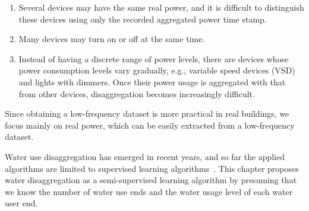 \begin{enumerate}
\item Several devices may have the same real power, and
it is difficult to distinguish these devices using only the recorded aggregated
power time stamp.
\item Many devices may turn on or off at the same time.
\item Instead of having a discrete range of power
levels, there are devices whose power consumption levels
   vary gradually, e.g.,
  variable speed devices (VSD) and lights with dimmers.
Once their power usage is aggregated with that from other devices,
disaggregation becomes increasingly difficult.
\end{enumerate}
Since obtaining a low-frequency dataset is more practical in real buildings, 
we focus mainly on real power, which can be easily extracted 
from a low-frequency dataset.  

Water use disaggregation has emerged in recent years, and so far 
the applied algorithms are 
limited to supervised learning algorithms~\cite{carboni2016contextualising}. 
This chapter proposes water disaggregation as a semi-supervised learning algorithm 
by presuming that we know the number of water use ends and the water usage level of each 
water user end.  


